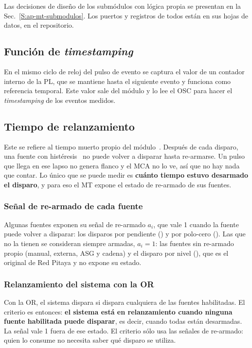 Las decisiones de diseño de los submódulos con lógica propia se presentan en la
Sec.~\ref{S:ap-mt-submodulos}. Los puertos y registros de todos están en sus
hojas de datos, en el repositorio.

\subsection{Función de \emph{timestamping}}
\label{S:mt-timestamping}

En el mismo ciclo de reloj del pulso de evento se captura el valor de un contador interno de la PL, que se mantiene hasta el
siguiente evento y funciona como referencia temporal. Este valor sale del módulo
y lo lee el OSC para hacer el \emph{timestamping} de los eventos medidos.

\subsection{Tiempo de relanzamiento}
\label{S:mt-relanzamiento}

Este se refiere al tiempo muerto propio del módulo~\cite{Knoll2010,Muller1973}.
Después de cada disparo, una fuente con histéresis~\cite{Schmitt1938} no puede
volver a disparar hasta re-armarse. Un pulso que llega en ese lapso no genera
flanco y el MCA no lo ve, así que no hay nada que contar. Lo único que se puede
medir es \textbf{cuánto tiempo estuvo desarmado el disparo}, y para eso el MT
expone el estado de re-armado de sus fuentes.

\subsubsection{Señal de re-armado de cada fuente}

Algunas fuentes exponen su señal de re-armado $a_i$, que vale 1 cuando la fuente
puede volver a disparar: los disparos por pendiente () y
por polo-cero (). Las que no la tienen se consideran
siempre armadas, $a_i = 1$: las fuentes sin re-armado propio (manual, externa,
ASG y cadena) y el disparo por nivel (), que es el
original de Red Pitaya y no expone su estado.

\subsubsection{Relanzamiento del sistema con la OR}

Con la OR, el sistema dispara si dispara cualquiera de las fuentes habilitadas.
El criterio es entonces: \textbf{el sistema está en relanzamiento cuando ninguna
fuente habilitada puede disparar}, es decir, cuando todas están desarmadas. La
señal  vale 1 fuera de ese estado. El criterio sólo usa las
señales de re-armado: quien lo consume no necesita saber qué disparo se utiliza.

